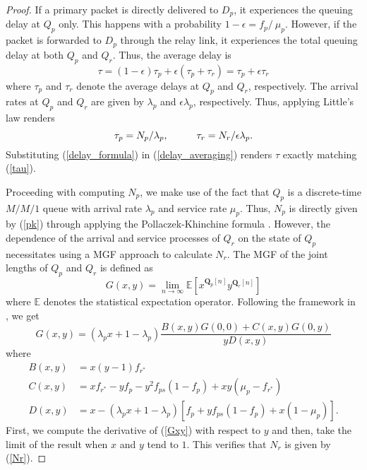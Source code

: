 \documentclass[journal,twocolumn]{IEEEtran}
\begin{document}
\begin{proof}
If a primary packet is directly delivered to $D_{p}$, it experiences the queuing delay at $Q_{p}$ only.
This happens with a probability $1-\epsilon=f_{p}/\ \mu_{p}$. However, if the packet is forwarded to $D_{p}$ through the relay link, it experiences the total queuing delay at both $Q_{p}$ and $Q_{r}$. Thus, the average delay is
\begin{equation}\label{delay_averaging}
\tau= (1-\epsilon)\tau_{p} + \epsilon (\tau_{p}+ \tau_{r})= \tau_{p} + \epsilon \tau_{r}
\end{equation}
where $\tau_{p}$ and $\tau_{r}$ denote the average delays at $Q_{p}$ and $Q_{r}$, respectively.
The arrival rates at $Q_{p}$ and $Q_{r}$ are given by $\lambda_{p}$ and $\epsilon \lambda_{p}$, respectively. Thus, applying Little's law
\cite{Bertsekas} renders
\begin{equation}\label{delay_formula}
\tau_{p}=N_{p}/ \lambda_{p}, \hspace{10mm} \tau_{r}=N_{r}/ \epsilon \lambda_{p}.
\end{equation}
Substituting (\ref{delay_formula}) in (\ref{delay_averaging}) renders $\tau$ exactly matching (\ref{tau}).

Proceeding with computing $N_{p}$, we make use of the fact that $Q_{p}$ is a discrete-time $M/M/1$ queue with arrival rate $\lambda_{p}$ and
service rate $\mu_{p}$. Thus, $N_{p}$ is directly given by (\ref{pk}) through applying the Pollaczek-Khinchine formula \cite{PK}. However, the
dependence of the arrival and service processes of $Q_{r}$ on the state of $Q_{p}$ necessitates using a MGF approach \cite{sidi} to calculate
$N_{r}$. The MGF of the joint lengths of $Q_{p}$ and $Q_{r}$ is defined as
\begin{equation}
G(x,y)= \lim_{n \rightarrow \infty} \mathbb{E} \left[ x^{\mathbf{Q}_{p}[n]} y^{\mathbf{Q}_{r}[n]} \right]
\end{equation}
where $\mathbb{E}$ denotes the statistical expectation operator. Following the framework in \cite{Ephremedis,ashour2015cognitive}, we get
\begin{equation}\label{Gxy}
G(x,y)=(\lambda_{p}x+1-\lambda_{p})\frac{B(x,y)G(0,0)+C(x,y)G(0,y)}{yD(x,y)}
\end{equation}
where
\begin{align}
B(x,y) &=x(y-1)f_{r^*} \nonumber \\
C(x,y) &=xf_{r^*}- yf_{p}- y^{2}f_{ps}(1- f_{p})+ xy(\mu_{p}- f_{r^*}) \nonumber \\
D(x,y) &=x \! - \!(\lambda_{p}x \!+\!  1  \!-\!  \lambda_{p})[f_{p}\! +\!  yf_{ps}(1 -  f_{p})+  x(1 -  \mu_p)].
\end{align}
First, we compute the derivative of (\ref{Gxy}) with respect to $y$ and then, take the limit of the result
when $x$ and $y$ tend to $1$. This verifies that $N_{r}$ is given by (\ref{Nr}).
\end{proof}
\end{document}
